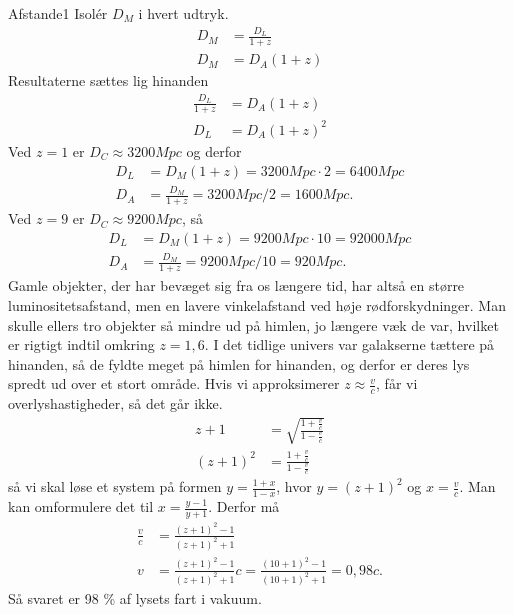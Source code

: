 \begin{opgave}{Afstande}{1}
	\opg Isolér $D_M$ i hvert udtryk.
	\begin{align}
		D_M &= \frac{D_L}{1+z}\\
		D_M &= D_A(1+z)
	\end{align}
	Resultaterne sættes lig hinanden
		\begin{align}
		\frac{D_L}{1+z} &= D_A(1+z)\\
		D_L &= D_A (1+z)^2
		\end{align}
	\opg Ved $z=1$ er $D_C\approx3200 Mpc$ og derfor
	\begin{align}
		D_L &= D_M(1+z)= 3200 Mpc \cdot 2 = 6400 Mpc\\
		D_A &= \frac{D_M}{1+z}= 3200 Mpc/ 2 = 1600 Mpc.
	\end{align}
	Ved $z=9$ er $D_C\approx9200 Mpc$, så
	\begin{align}
		D_L &= D_M(1+z)= 9200 Mpc \cdot 10 = 92000 Mpc\\
		D_A &= \frac{D_M}{1+z}= 9200 Mpc/ 10 = 920 Mpc.
	\end{align}
	Gamle objekter, der har bevæget sig fra os længere tid, har altså en større luminositetsafstand, men en lavere vinkelafstand ved høje rødforskydninger. Man skulle ellers tro objekter så mindre ud på himlen, jo længere væk de var, hvilket er rigtigt indtil omkring $z=1,6$. I det tidlige univers var galakserne tættere på hinanden, så de fyldte meget på himlen for hinanden, og derfor er deres lys spredt ud over et stort område.
	\opg
	Hvis vi approksimerer $z\approx\frac{v}{c}$, får vi overlyshastigheder, så det går ikke.
	\begin{align}
	z+1&=\sqrt{\frac{1+\frac{v}{c}}{1-\frac{v}{c}}}\\
	(z+1)^2&=\frac{1+\frac{v}{c}}{1-\frac{v}{c}}
	\end{align}
	så vi skal løse et system på formen $y=\frac{1+x}{1-x}$, hvor $y=(z+1)^2$ og $x=\frac{v}{c}$. Man kan omformulere det til $x=\frac{y-1}{y+1}$. Derfor må
	\begin{align}
	\frac{v}{c}&=\frac{(z+1)^2-1}{(z+1)^2+1}\\
	v&=\frac{(z+1)^2-1}{(z+1)^2+1} c = \frac{(10+1)^2-1}{(10+1)^2+1} = 0,98 c. %
	\end{align}
	Så svaret er 98 \% af lysets fart i vakuum.
\end{opgave}
